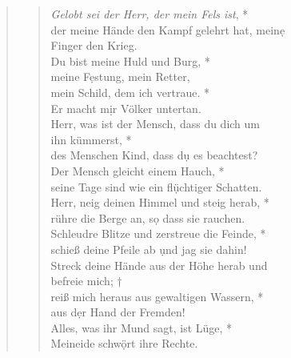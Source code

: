 \begin{quote}
\vspace{0.3cm}

\def\greinitialformat#1{{\fontsize{40}{40}\selectfont #1}}
\gresetfirstlineaboveinitial{\small \textcolor{red}{Ps 144}}{}
\setaboveinitialseparation{0.72mm}

\vspace{0.3cm}


 
\begin{verse}
 \textit{Gelobt sei der Herr, der mein Fels ist}, *\\
der meine Hände den Kampf gelehrt hat, mein\d e\\ Finger den Krieg.\\ \vin  
Du bist meine Huld und Burg, * \\ \vin 
meine F\d estung, mein Retter, \\
mein Schild, dem ich vertraue. *\\ Er macht m\d ir Völker untertan. \\ \vin 
Herr, was ist der Mensch, dass du dich um \\ \vin ihn kümmerst, *\\ \vin 
des Menschen Kind, dass d\d u es beachtest? \\
Der Mensch gleicht einem Hauch, *\\
seine Tage sind wie ein fl\d üchtiger Schatten.\\ \vin  
Herr, neig deinen Himmel und steig herab, *\\ \vin 
rühre die Berge an, s\d o dass sie rauchen.\\ 
Schleudre Blitze und zerstreue die Feinde, *\\
schieß deine Pfeile ab \d und jag sie dahin!\\ \vin 
Streck deine Hände aus der Höhe herab und\\ \vin  befreie mich; †\\ \vin 
reiß mich heraus aus gewaltigen Wassern, *\\ \vin  aus d\d er Hand der Fremden!\\
Alles, was ihr Mund sagt, ist Lüge, *\\
Meineide schw\d ört ihre Rechte.\\
\end{verse}

\end{quote}

